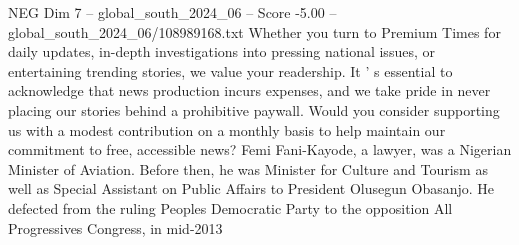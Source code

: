 \begin{textsample}{NEG Dim 7 – global\_south\_2024\_06 – Score -5.00 – global\_south\_2024\_06/108989168.txt}
Whether you turn to Premium Times for daily updates, in-depth investigations into pressing national issues, or entertaining trending stories, we value your readership.
It ' s essential to acknowledge that news production incurs expenses, and we take pride in never placing our stories behind a prohibitive paywall.
Would you consider supporting us with a modest contribution on a monthly basis to help maintain our commitment to free, accessible news?
Femi Fani-Kayode, a lawyer, was a Nigerian Minister of Aviation.
Before then, he was Minister for Culture and Tourism as well as Special Assistant on Public Affairs to President Olusegun Obasanjo.
He defected from the ruling Peoples Democratic Party to the opposition All Progressives Congress, in mid-2013

\end{textsample}
